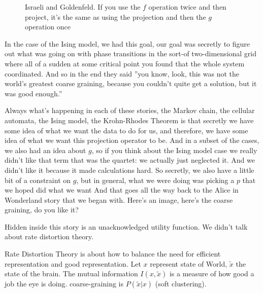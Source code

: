 \documentclass[]{article}
\begin{document}
\begin{figure}[H]
	\begin{center}
		\caption[Israeli and Goldenfeld]{Israeli and Goldenfeld. If you use the $f$ operation twice and then project, it's the same as using the projection and then the $g$ operation once}\label{fig:renormalization-relationship1}
	\end{center}
\end{figure}

In the case of the Ising model, we had
this goal, our goal was secretly to figure
out what was going on with phase
transitions in the sort-of two-dimensional
grid where all of a sudden at some
critical point you found that the whole
system coordinated. And so in the end they
said ''you know, look, this was not the
world's greatest coarse graining, because
you couldn't quite get a solution, but it
was good enough.''

Always what's happening
in each of these stories, the Markov
chain, the cellular automata, the Ising
model, the Krohn-Rhodes Theorem is that
secretly we have some idea of what we want
the data to do for us, and therefore, we
have some idea of what we want this
projection operator to be. And in a subset
of the cases, we also had an idea about $g$,
so if you think about the Ising model case
we really didn't like that term that was
the quartet: we actually just neglected it. And we
didn't like it because it made
calculations hard. So secretly, we also
have a little bit of a constraint on $g$,
but in general, what we were doing was
picking a $p$ that we hoped did what we want
And that goes all the way back to the
Alice in Wonderland story that we began
with. Here's an image, here's the coarse
graining, do you like it?


Hidden inside this story is an unacknowledged utility function. We didn't talk about rate distortion theory.

Rate Distortion Theory is about how to balance the need for efficient representation and good representation. Let ${x}$ represent state of World, ${\tilde{x}}$ the state of the brain. The mutual information $I(x,\tilde{x})$ is a measure of how good a job the eye is doing. coarse-graining is $P(\tilde{x}\vert x)$ (soft clustering).
\end{document}
